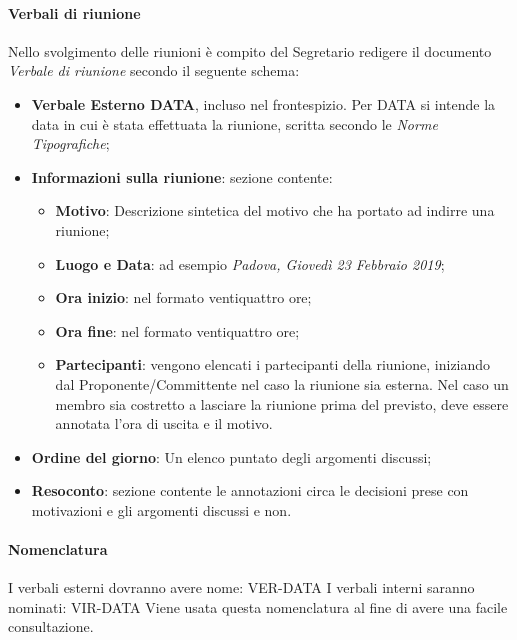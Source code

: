                    \paragraph{Verbali di riunione}
                       Nello svolgimento delle riunioni è compito del Segretario redigere il documento \textit{Verbale di riunione} secondo il seguente schema:
                        \begin{itemize}
                            \item \textbf{Verbale Esterno DATA}, incluso nel frontespizio. Per DATA si intende la data in cui è stata effettuata la riunione, scritta secondo le \textit{Norme Tipografiche};
                            \item \textbf{Informazioni sulla riunione}: sezione contente:
                            \begin{itemize}
                                \item \textbf{Motivo}: Descrizione sintetica del motivo che ha portato ad indirre una riunione;
                                \item \textbf{Luogo e Data}: ad esempio \textit{Padova, Giovedì 23 Febbraio 2019}; 
                                \item \textbf{Ora inizio}: nel formato ventiquattro ore;
                                \item \textbf{Ora fine}: nel formato ventiquattro ore;
                                \item \textbf{Partecipanti}: vengono elencati i partecipanti della riunione, iniziando dal Proponente/Committente nel caso la riunione sia esterna. Nel caso un membro sia costretto a lasciare la riunione prima del previsto, deve essere annotata l'ora di uscita e il motivo.
                            \end{itemize}
                            \item \textbf{Ordine del giorno}: Un elenco puntato degli argomenti discussi; 
                            \item \textbf{Resoconto}: sezione contente le annotazioni circa le decisioni prese con motivazioni e gli argomenti discussi e non.
                        \end{itemize}
                        \paragraph{Nomenclatura} 
                            I verbali esterni dovranno avere nome:
                            VER-DATA
                            \newline
                            I verbali interni saranno nominati:
                            VIR-DATA
                            \newline
                            Viene usata questa nomenclatura al fine di avere una facile consultazione.
                            \newline
